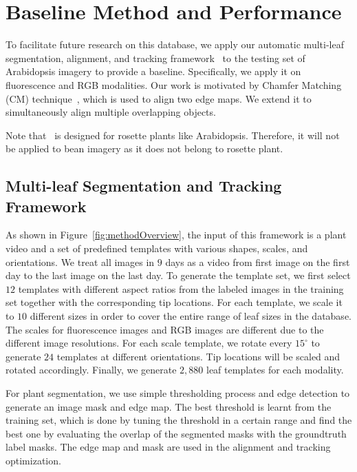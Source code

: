 \section{Baseline Method and Performance}
\label{sec:baseline}

To facilitate future research on this database, we apply our automatic multi-leaf segmentation, alignment, and tracking framework~\cite{yin2014a,yin2014b} to the testing set of Arabidopsis imagery to provide a baseline.
Specifically, we apply it on fluorescence and RGB modalities. 
Our work is motivated by Chamfer Matching (CM) technique~\cite{barrow1977parametric}, which is used to align two edge maps.
We extend it to simultaneously align multiple overlapping objects.

Note that~\cite{yin2014a,yin2014b} is designed for rosette plants like Arabidopsis.
Therefore, it will not be applied to bean imagery as it does not belong to rosette plant.

\subsection{Multi-leaf Segmentation and Tracking Framework}
As shown in Figure~\ref{fig:methodOverview}, the input of this framework is a plant video and a set of predefined templates with various shapes, scales, and orientations.
We treat all images in $9$ days as a video from first image on the first day to the last image on the last day.
To generate the template set, we first select $12$ templates with different aspect ratios from the labeled images in the training set together with the corresponding tip locations.
For each template, we scale it to $10$ different sizes in order to cover the entire range of leaf sizes in the database.
The scales for fluorescence images and RGB images are different due to the different image resolutions. 
For each scale template, we rotate every $15^{\circ}$ to generate $24$ templates at different orientations.
Tip locations will be scaled and rotated accordingly.
Finally, we generate $2,880$ leaf templates for each modality. 


For plant segmentation, we use simple thresholding process and edge detection to generate an image mask and edge map.
The best threshold is learnt from the training set, which is done by tuning the threshold in a certain range and find the best one by evaluating the overlap of the segmented masks with the groundtruth label masks.
The edge map and mask are used in the alignment and tracking optimization.

